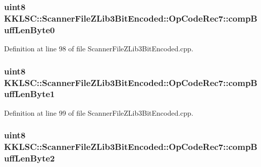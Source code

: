 \subsubsection[{\texorpdfstring{comp\+Buff\+Len\+Byte0}{compBuffLenByte0}}]{\setlength{\rightskip}{0pt plus 5cm}uint8 K\+K\+L\+S\+C\+::\+Scanner\+File\+Z\+Lib3\+Bit\+Encoded\+::\+Op\+Code\+Rec7\+::comp\+Buff\+Len\+Byte0}\hypertarget{struct_scanner_file_z_lib3_bit_encoded_1_1_op_code_rec7_ac7a1bf295f06380266935a2c6618153a}{}\label{struct_scanner_file_z_lib3_bit_encoded_1_1_op_code_rec7_ac7a1bf295f06380266935a2c6618153a}


Definition at line 98 of file Scanner\+File\+Z\+Lib3\+Bit\+Encoded.\+cpp.

\subsubsection[{\texorpdfstring{comp\+Buff\+Len\+Byte1}{compBuffLenByte1}}]{\setlength{\rightskip}{0pt plus 5cm}uint8 K\+K\+L\+S\+C\+::\+Scanner\+File\+Z\+Lib3\+Bit\+Encoded\+::\+Op\+Code\+Rec7\+::comp\+Buff\+Len\+Byte1}\hypertarget{struct_scanner_file_z_lib3_bit_encoded_1_1_op_code_rec7_aa45a5de904215c93854cddfe8d993d80}{}\label{struct_scanner_file_z_lib3_bit_encoded_1_1_op_code_rec7_aa45a5de904215c93854cddfe8d993d80}


Definition at line 99 of file Scanner\+File\+Z\+Lib3\+Bit\+Encoded.\+cpp.

\subsubsection[{\texorpdfstring{comp\+Buff\+Len\+Byte2}{compBuffLenByte2}}]{\setlength{\rightskip}{0pt plus 5cm}uint8 K\+K\+L\+S\+C\+::\+Scanner\+File\+Z\+Lib3\+Bit\+Encoded\+::\+Op\+Code\+Rec7\+::comp\+Buff\+Len\+Byte2}\hypertarget{struct_scanner_file_z_lib3_bit_encoded_1_1_op_code_rec7_a150876ad1c9e3044cb4df52f4ee95e12}{}\label{struct_scanner_file_z_lib3_bit_encoded_1_1_op_code_rec7_a150876ad1c9e3044cb4df52f4ee95e12}


